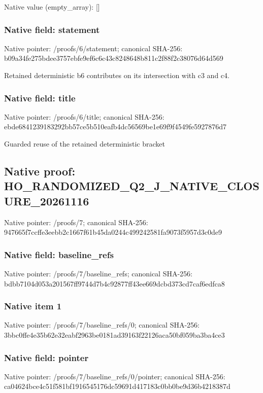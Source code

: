 \documentclass[10pt,a4paper]{article}
\begin{document}
Native value (empty\_\allowbreak{}array): []

\subsubsection{Native field: statement}
Native pointer: /proofs/6/statement; canonical SHA-256: b09a34fe275bdee3757ebfe9ef6c6c43c8248648b811c2f88f2c38076d64d569

\begingroup\raggedright\sloppy Retained deterministic b6 contributes on its intersection with c3 and c4.\par\endgroup

\subsubsection{Native field: title}
Native pointer: /proofs/6/title; canonical SHA-256: ebde6841239183292bb57ce5b510eafb4dc56569be1e69f9f4549fe5927876d7

\begingroup\raggedright\sloppy Guarded reuse of the retained deterministic bracket\par\endgroup

\subsection{Native proof: HO\_\allowbreak{}RANDOMIZED\_\allowbreak{}Q2\_\allowbreak{}J\_\allowbreak{}NATIVE\_\allowbreak{}CLOSURE\_\allowbreak{}20261116}
Native pointer: /proofs/7; canonical SHA-256: 947665f7ccffe3eebb2c1667f61b45da0244c499242581fa9073f5957d3c0de9

\subsubsection{Native field: baseline\_\allowbreak{}refs}
Native pointer: /proofs/7/baseline\_\allowbreak{}refs; canonical SHA-256: bdbb7104d053a201567ff9744d7b4c92877ff43ee669dcbd373cd7caf6edfca8

\subsubsection{Native item 1}
Native pointer: /proofs/7/baseline\_\allowbreak{}refs/0; canonical SHA-256: 3bbc0ffe4e35b62e32eabf2963be0181ad39163f22126aca50bf059ba3ba4ce3

\subsubsection{Native field: pointer}
Native pointer: /proofs/7/baseline\_\allowbreak{}refs/0/pointer; canonical SHA-256: ca04624bce4c51f581bf1916545176dc59691d417183c0bb0be9d36b4218387d
\end{document}
